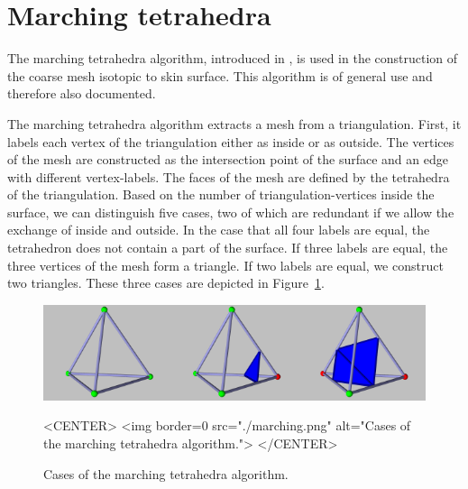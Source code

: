 
\section{Marching tetrahedra}
The marching tetrahedra algorithm, introduced in
\cite{cgal:tpg-rmtiise-99}, is used in the construction of the coarse
mesh isotopic to skin surface. This algorithm is of general use and
therefore also documented.

The marching tetrahedra algorithm extracts a mesh from a
triangulation.  First, it labels each vertex of the triangulation
either as inside or as outside. The vertices of the mesh are
constructed as the intersection point of the surface and an edge with
different vertex-labels. The faces of the mesh are defined by the
tetrahedra of the triangulation. Based on the number of
triangulation-vertices inside the surface, we can distinguish five
cases, two of which are redundant if we allow the exchange of inside
and outside. In the case that all four labels are equal, the
tetrahedron does not contain a part of the surface. If three labels
are equal, the three vertices of the mesh form a triangle. If two
labels are equal, we construct two triangles. These three cases are
depicted in Figure~\ref{SkinSurface3-fig-marching}.

\begin{figure}
\begin{ccTexOnly}
\begin{center}
\includegraphics[width=.8\textwidth]{Skin_surface_3/marching}
\end{center}
\end{ccTexOnly}
\begin{ccHtmlOnly}
<CENTER>
<img border=0 src="./marching.png"
alt="Cases of the marching tetrahedra algorithm.">
</CENTER>
\end{ccHtmlOnly}

\caption{\label{SkinSurface3-fig-marching} Cases of the marching
  tetrahedra algorithm.}
\end{figure}

